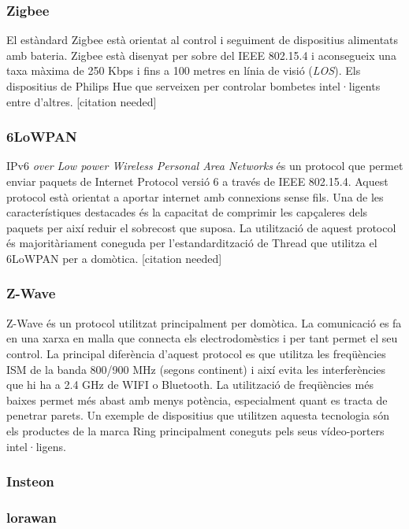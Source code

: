 \subsubsection{Zigbee}
El estàndard Zigbee està orientat al control i seguiment de dispositius alimentats amb bateria. Zigbee està disenyat per sobre del IEEE 802.15.4 i aconsegueix una taxa màxima  de 250 Kbps i fins a 100 metres en línia de visió (\textit{LOS}).
Els dispositius de Philips Hue que serveixen per controlar bombetes intel·ligents entre d'altres.
[citation needed]

\subsubsection{6LoWPAN}
IPv6 \textit{over Low power Wireless Personal Area Networks} és un protocol que permet enviar paquets de Internet Protocol versió 6 a través de IEEE 802.15.4.
Aquest protocol està orientat a aportar internet amb connexions sense fils.
Una de les característiques destacades és la capacitat de comprimir les capçaleres dels paquets per així reduir el sobrecost que suposa.
La utilització de aquest protocol és majoritàriament coneguda per l'estandardització de Thread que utilitza el 6LoWPAN per a domòtica. [citation needed]


\subsubsection{Z-Wave}
Z-Wave és un protocol utilitzat principalment per domòtica. La comunicació es fa en una xarxa en malla que connecta els electrodomèstics i per tant permet el seu control.
La principal diferència d'aquest protocol es que utilitza les freqüències ISM de la banda 800/900 MHz (segons continent) i així evita les interferències que hi ha a 2.4 GHz de WIFI o Bluetooth.
La utilització de freqüències més baixes permet més abast amb menys potència, especialment quant es tracta de penetrar parets.
Un exemple de dispositius que utilitzen aquesta tecnologia són els productes de la marca Ring principalment coneguts pels seus vídeo-porters intel·ligens.


\subsubsection{Insteon}
\subsubsection{lorawan}


